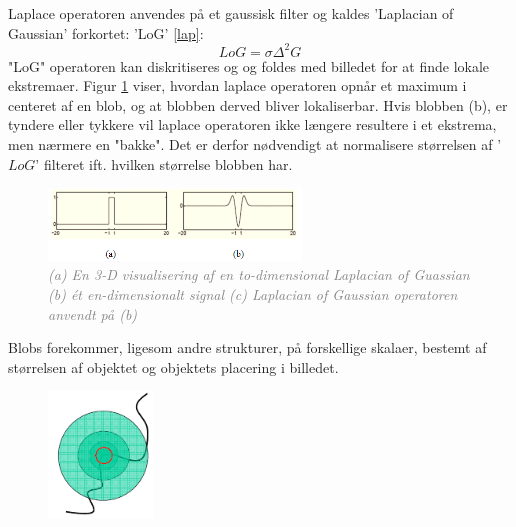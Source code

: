  Laplace operatoren anvendes på et gaussisk filter og kaldes 'Laplacian of Gaussian' forkortet: 'LoG' \eqref{lap}:
\begin{equation}
LoG=\sigma\Delta^2G
\label{lap}
\end{equation}
"LoG" operatoren kan diskritiseres og og foldes med billedet for at finde lokale ekstremaer. Figur \ref{fig:lapgauss} viser, hvordan laplace operatoren opnår et maximum i centeret af en blob, og at blobben derved bliver lokaliserbar. Hvis blobben (b), er tyndere eller tykkere vil laplace operatoren ikke længere resultere i et ekstrema, men nærmere en "bakke". Det er derfor nødvendigt at normalisere størrelsen af '$LoG$' filteret ift. hvilken størrelse blobben har.
\begin{figure}[H]
    \centering
    \includegraphics[width=0.60\textwidth]{fig/16.png}
    \vspace{-0.5em}   
    \begin{center}
    \caption{\textcolor{gray}{\footnotesize \textit{
    (a) En 3-D visualisering af en to-dimensional Laplacian of Guassian (b) ét en-dimensionalt signal (c) Laplacian of Gaussian operatoren anvendt på (b)}}}
    \label{fig:lapgauss}
     \end{center}
  \end{figure}
       \vspace{-2.5em}
\noindent
Blobs forekommer, ligesom andre strukturer, på forskellige skalaer, bestemt af størrelsen af objektet og objektets placering i billedet.
\begin{figure}[H]
    \centering
    \includegraphics[width=0.25\textwidth]{fig/29.png}
    \vspace{-0.5em}   
    \begin{center}
    \caption{\textcolor{gray}{\footnotesize \textit{
    }}}
    \label{fig:scale}
     \end{center}
  \end{figure}
